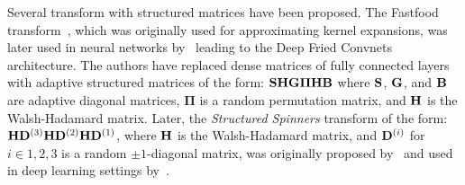 Several transform with structured matrices have been proposed.
The Fastfood transform~\cite{le2013fastfood}, which was originally used for approximating kernel expansions, was later used in neural networks by~\citet{yang2015deep} leading to the Deep Fried Convnets architecture.
The authors have replaced dense matrices of fully connected layers with adaptive structured matrices of the form: $\mathbf{S}\mathbf{H}\mathbf{G}\mathbf{\Pi}\mathbf{H}\mathbf{B}$ where $\mathbf{S}$, $\mathbf{G}$, and $\mathbf{B}$ are adaptive diagonal matrices, $\mathbf{\Pi}$ is a random permutation matrix, and $\mathbf{H}$ is the Walsh-Hadamard matrix.
Later, the \emph{Structured Spinners} transform of the form: $\mathbf{H}\mathbf{D}^{(3)} \mathbf{H}\mathbf{D}^{(2)} \mathbf{H}\mathbf{D}^{(1)}$, where $\mathbf{H}$ is the Walsh-Hadamard matrix, and $\mathbf{D}^{(i)}$ for $i \in {1, 2, 3}$ is a random $\pm1$-diagonal matrix, was originally proposed by~\citet{andoni2015practical} and used in deep learning settings by~\citet{bojarski2017structured}.

